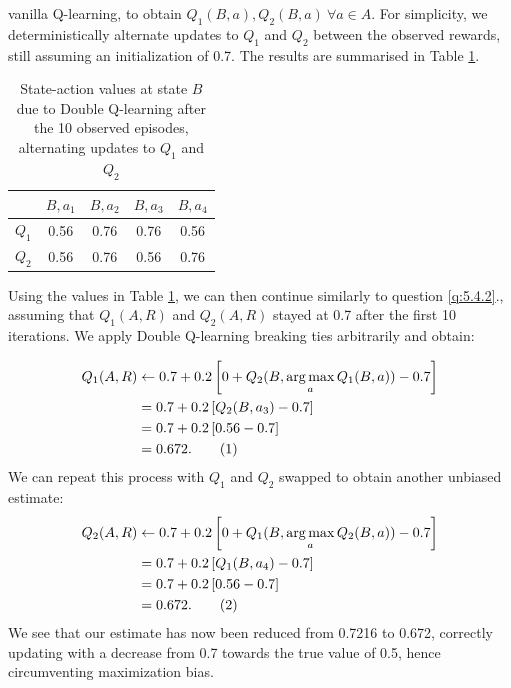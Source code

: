 \documentclass{article}
\newcommand\numberthis{\addtocounter{equation}{1}\tag{\theequation}}
\DeclareMathOperator*{\argmax}{arg\,max}
\begin{document}
\begin{enumerate}
	      vanilla Q-learning, to obtain $Q_1(B, a), Q_2(B, a) ~ \forall a \in A$. For simplicity, we
	      deterministically alternate updates to $Q_1$ and $Q_2$ between the observed rewards, still
	      assuming an initialization of 0.7. The results are summarised in Table \ref{tab:b_double_qvalues}.
	      \begin{table}[t]
		      \centering
		      \caption{State-action values at state $B$ due to Double Q-learning after the 10 observed episodes, alternating updates to $Q_1$ and $Q_2$}
		      \label{tab:b_double_qvalues}
		      \begin{tabular}{@{}ccccc@{}}
			      \toprule
			      \textbf{}      & $B, a_1$ & $B, a_2$ & $B, a_3$ & $B, a_4$ \\ \midrule
			      \textbf{$Q_1$} & 0.56     & 0.76     & 0.76     & 0.56     \\
			      $Q_2$          & 0.56     & 0.76     & 0.56     & 0.76     \\ \bottomrule
		      \end{tabular}
	      \end{table}
	      Using the values in Table \ref{tab:b_double_qvalues}, we can
	      then continue similarly to question \ref{q:5.4.2}., assuming that $Q_1(A, R)$ and $Q_2(A, R)$ stayed at
	      0.7 after the first 10 iterations. We apply Double Q-learning breaking ties arbitrarily and
	      obtain:

	      \begin{align*}
		      Q_1(A, R) & \leftarrow 0.7 + 0.2 \left[ 0 + Q_2(B, \argmax_aQ_1(B, a)) - 0.7\right] \\
		                & = 0.7 + 0.2 \left[ Q_2(B, a_3) - 0.7\right]                             \\
		                & = 0.7 + 0.2 \left[ 0.56 - 0.7\right]                                    \\
		                & = 0.672. \numberthis
	      \end{align*}
	      We can repeat this process with $Q_1$ and $Q_2$ swapped to obtain another unbiased estimate:
	      \begin{align*}
		      Q_2(A, R) & \leftarrow 0.7 + 0.2 \left[ 0 + Q_1(B, \argmax_aQ_2(B, a)) - 0.7\right] \\
		                & = 0.7 + 0.2 \left[ Q_1(B, a_4) - 0.7\right]                             \\
		                & = 0.7 + 0.2 \left[ 0.56 - 0.7\right]                                    \\
		                & = 0.672. \numberthis
	      \end{align*}
	      We see that our estimate has now been reduced from 0.7216 to 0.672, correctly updating with
	      a decrease from 0.7 towards the true value of 0.5, hence circumventing maximization bias.
\end{enumerate}
\end{document}
